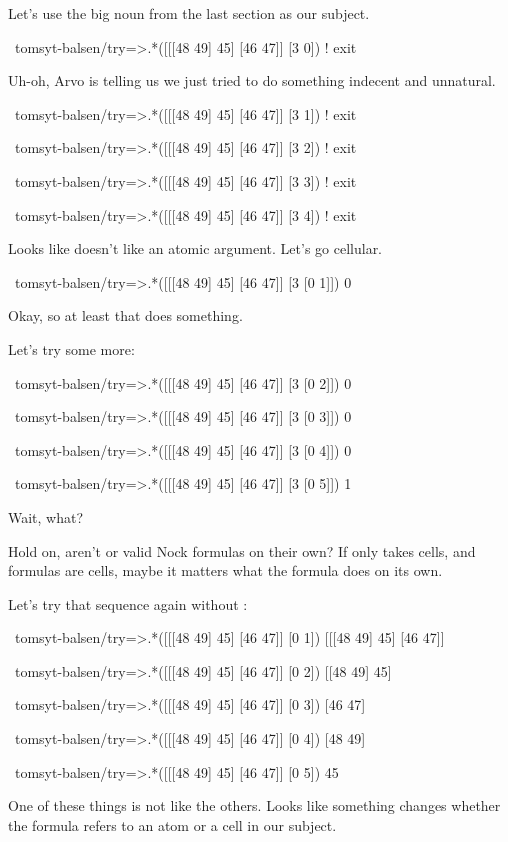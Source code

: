 Let's use the big noun \kode{[[[48 49] 45] [46 47]]} from the last section as our subject. 
\begin{code}
~tomsyt-balsen/try=>.*([[[48 49] 45] [46 47]] [3 0])
! exit
\end{code}
Uh-oh, Arvo is telling us we just tried to do something indecent and unnatural. 
\begin{code}
~tomsyt-balsen/try=>.*([[[48 49] 45] [46 47]] [3 1])
! exit

~tomsyt-balsen/try=>.*([[[48 49] 45] [46 47]] [3 2])
! exit

~tomsyt-balsen/try=>.*([[[48 49] 45] [46 47]] [3 3])
! exit

~tomsyt-balsen/try=>.*([[[48 49] 45] [46 47]] [3 4])
! exit
\end{code}
Looks like  doesn't like an atomic argument. Let's go cellular.
\begin{code}
~tomsyt-balsen/try=>.*([[[48 49] 45] [46 47]] [3 [0 1]])
0
\end{code}
Okay, so at least that does something.

Let's try some more:
\begin{code}
~tomsyt-balsen/try=>.*([[[48 49] 45] [46 47]] [3 [0 2]])
0

~tomsyt-balsen/try=>.*([[[48 49] 45] [46 47]] [3 [0 3]])
0

~tomsyt-balsen/try=>.*([[[48 49] 45] [46 47]] [3 [0 4]])
0

~tomsyt-balsen/try=>.*([[[48 49] 45] [46 47]] [3 [0 5]])
1
\end{code}
Wait, what?

Hold on, aren't \kode{[0 1]} or \kode{[0 5]} valid Nock formulas on their own?  If 
only takes cells, and formulas are cells, maybe it matters what the formula
does on its own.

Let's try that sequence again without :
\begin{code}
~tomsyt-balsen/try=>.*([[[48 49] 45] [46 47]] [0 1])
[[[48 49] 45] [46 47]]

~tomsyt-balsen/try=>.*([[[48 49] 45] [46 47]] [0 2])
[[48 49] 45]

~tomsyt-balsen/try=>.*([[[48 49] 45] [46 47]] [0 3])
[46 47]

~tomsyt-balsen/try=>.*([[[48 49] 45] [46 47]] [0 4])
[48 49]

~tomsyt-balsen/try=>.*([[[48 49] 45] [46 47]] [0 5])
45
\end{code}
One of these things is not like the others. Looks like something changes
whether the formula \kode{[0 n]} refers to an atom or a cell in our subject.

